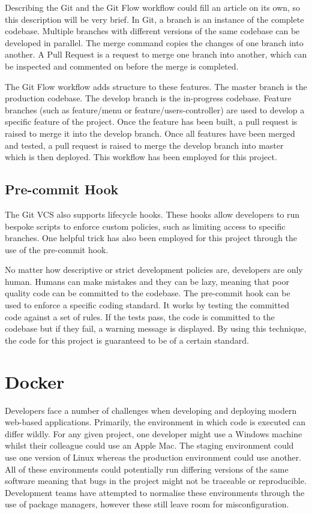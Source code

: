     Describing the Git and the Git Flow workflow could fill an article on its own, so this description will be very brief. In Git, a branch is an instance of the complete codebase. Multiple branches with different versions of the same codebase can be developed in parallel. The merge command copies the changes of one branch into another. A Pull Request is a request to merge one branch into another, which can be inspected and commented on before the merge is completed.

    The Git Flow workflow adds structure to these features. The master branch is the production codebase. The develop branch is the in-progress codebase. Feature branches (such as feature/menu or feature/users-controller) are used to develop a specific feature of the project. Once the feature has been built, a pull request is raised to merge it into the develop branch. Once all features have been merged and tested, a pull request is raised to merge the develop branch into master which is then deployed. This workflow has been employed for this project.

    \subsection{Pre-commit Hook}
    \label{section:pre-commit-hook}
      The Git VCS also supports lifecycle hooks. These hooks allow developers to run bespoke scripts to enforce custom policies, such as limiting access to specific branches. One helpful trick has also been employed for this project through the use of the pre-commit hook.

      No matter how descriptive or strict development policies are, developers are only human. Humans can make mistakes and they can be lazy, meaning that poor quality code can be committed to the codebase. The pre-commit hook can be used to enforce a specific coding standard. It works by testing the committed code against a set of rules. If the tests pass, the code is committed to the codebase but if they fail, a warning message is displayed. By using this technique, the code for this project is guaranteed to be of a certain standard.

  \section{Docker}
  \label{section:docker}
    Developers face a number of challenges when developing and deploying modern web-based applications. Primarily, the environment in which code is executed can differ wildly. For any given project, one developer might use a Windows machine whilst their colleague could use an Apple Mac. The staging environment could use one version of Linux whereas the production environment could use another. All of these environments could potentially run differing versions of the same software meaning that bugs in the project might not be traceable or reproducible. Development teams have attempted to normalise these environments through the use of package managers, however these still leave room for misconfiguration.

